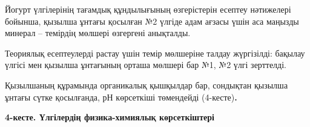 
Йогурт үлгілерінің тағамдық құндылығының өзгерістерін есептеу нәтижелері
бойынша, қызылша ұнтағы қосылған №2 үлгіде адам ағзасы үшін аса маңызды
минерал -- темірдің мөлшері өзгергені анықталды.

Теориялық есептеулерді растау үшін темір мөлшеріне талдау жүргізілді:
бақылау үлгісі мен қызылша ұнтағының орташа мөлшері бар №1, №2 үлгі
зерттелді.

Қызылшаның құрамында органикалық қышқылдар бар, сондықтан қызылша ұнтағы
сүтке қосылғанда, рН көрсеткіші төмендейді (4-кесте){\bfseries .}

{\bfseries 4-кесте. Үлгілердің физика-химиялық көрсеткіштері}

